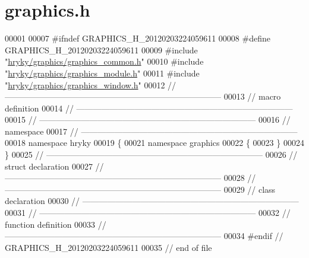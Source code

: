 \hypertarget{graphics_8h_source}{\section{graphics.\-h}
}

\begin{DoxyCode}
00001 
00007 \textcolor{preprocessor}{#ifndef GRAPHICS\_H\_20120203224059611}
00008 \textcolor{preprocessor}{}\textcolor{preprocessor}{#define GRAPHICS\_H\_20120203224059611}
00009 \textcolor{preprocessor}{}\textcolor{preprocessor}{#include "\hyperlink{graphics__common_8h}{hryky/graphics/graphics_common.h}"}
00010 \textcolor{preprocessor}{#include "\hyperlink{graphics__module_8h}{hryky/graphics/graphics_module.h}"}
00011 \textcolor{preprocessor}{#include "\hyperlink{graphics__window_8h}{hryky/graphics/graphics_window.h}"}
00012 \textcolor{comment}{//
      ------------------------------------------------------------------------------}
00013 \textcolor{comment}{// macro definition}
00014 \textcolor{comment}{//
      ------------------------------------------------------------------------------}
00015 \textcolor{comment}{//
      ------------------------------------------------------------------------------}
00016 \textcolor{comment}{// namespace}
00017 \textcolor{comment}{//
      ------------------------------------------------------------------------------}
00018 \textcolor{keyword}{namespace }hryky
00019 \{
00021 \textcolor{keyword}{namespace }graphics
00022 \{
00023 \}
00024 \}
00025 \textcolor{comment}{//
      ------------------------------------------------------------------------------}
00026 \textcolor{comment}{// struct declaration}
00027 \textcolor{comment}{//
      ------------------------------------------------------------------------------}
00028 \textcolor{comment}{//
      ------------------------------------------------------------------------------}
00029 \textcolor{comment}{// class declaration}
00030 \textcolor{comment}{//
      ------------------------------------------------------------------------------}
00031 \textcolor{comment}{//
      ------------------------------------------------------------------------------}
00032 \textcolor{comment}{// function definition}
00033 \textcolor{comment}{//
      ------------------------------------------------------------------------------}
00034 \textcolor{preprocessor}{#endif // GRAPHICS\_H\_20120203224059611}
00035 \textcolor{preprocessor}{}\textcolor{comment}{// end of file}
\end{DoxyCode}
